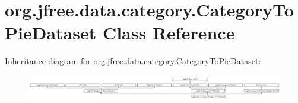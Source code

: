 \hypertarget{classorg_1_1jfree_1_1data_1_1category_1_1_category_to_pie_dataset}{}\section{org.\+jfree.\+data.\+category.\+Category\+To\+Pie\+Dataset Class Reference}
\label{classorg_1_1jfree_1_1data_1_1category_1_1_category_to_pie_dataset}
Inheritance diagram for org.\+jfree.\+data.\+category.\+Category\+To\+Pie\+Dataset\+:\begin{figure}[H]
\begin{center}
\leavevmode
\includegraphics[height=1.138790cm]{classorg_1_1jfree_1_1data_1_1category_1_1_category_to_pie_dataset}
\end{center}
\end{figure}
